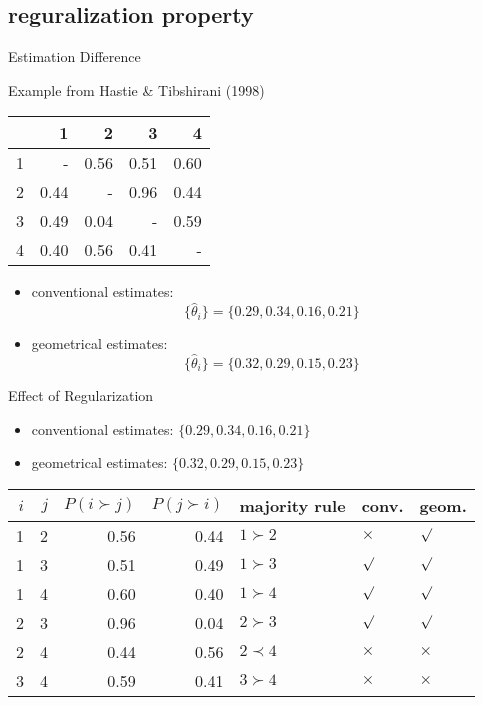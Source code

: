 \documentclass[fleqn,aspectratio=1610]{beamer}
\begin{document}
\subsection{reguralization property}
\label{sec:orgff55c09}
\begin{frame}[label={sec:orgf099b49}]{Estimation Difference}
\begin{exampleblock}{Example from Hastie \& Tibshirani (1998)}\label{sec:orgde71173}
\begin{center}
\begin{tabular}{r|rrrr}
\hline
 & 1 & 2 & 3 & 4\\[0pt]
\hline
1 & - & 0.56 & 0.51 & 0.60\\[0pt]
2 & 0.44 & - & 0.96 & 0.44\\[0pt]
3 & 0.49 & 0.04 & - & 0.59\\[0pt]
4 & 0.40 & 0.56 & 0.41 & -\\[0pt]
\hline
\end{tabular}
\end{center}
\end{exampleblock}
\begin{itemize}
\item <2-> conventional estimates:
\begin{equation}
  \{\hat\theta_{i}\}=\{0.29,0.34,0.16,0.21\}
\end{equation}
\item <3-> geometrical estimates:
\begin{equation}
  \{\hat\theta_{i}\}=\{0.32,0.29,0.15,0.23\}
\end{equation}
\end{itemize}
\end{frame}
\begin{frame}[label={sec:org133e023}]{Effect of Regularization}
\begin{itemize}
\item conventional estimates: \(\{0.29,0.34,0.16,0.21\}\)
\item geometrical estimates: \(\{0.32,0.29,0.15,0.23\}\)
\end{itemize}
\begin{center}
\begin{center}
\begin{tabular}{rr|rr|l|ll}
\hline
\(i\) & \(j\) & \(P(i\succ j)\) & \(P(j\succ i)\) & majority rule & conv. & geom.\\[0pt]
\hline
1 & 2 & 0.56 & 0.44 & \(1 \succ 2\) & \(\times\) & \(\surd\)\\[0pt]
1 & 3 & 0.51 & 0.49 & \(1 \succ 3\) & \(\surd\) & \(\surd\)\\[0pt]
1 & 4 & 0.60 & 0.40 & \(1 \succ 4\) & \(\surd\) & \(\surd\)\\[0pt]
2 & 3 & 0.96 & 0.04 & \(2 \succ 3\) & \(\surd\) & \(\surd\)\\[0pt]
2 & 4 & 0.44 & 0.56 & \(2 \prec 4\) & \(\times\) & \(\times\)\\[0pt]
3 & 4 & 0.59 & 0.41 & \(3 \succ 4\) & \(\times\) & \(\times\)\\[0pt]
\hline
\end{tabular}
\end{center}
\end{center}
\end{frame}
\end{document}
